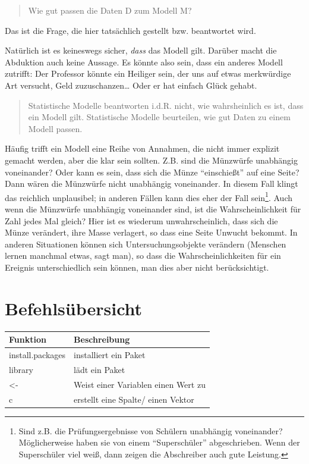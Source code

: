 \documentclass[12pt,ngerman,]{book}
\let\rmarkdownfootnote\footnote%
\def\footnote{\protect\rmarkdownfootnote}
\begin{document}
\begin{quote}
Wie gut passen die Daten D zum Modell M?
\end{quote}

Das ist die Frage, die hier tatsächlich gestellt bzw. beantwortet wird.

Natürlich ist es keineswegs sicher, \emph{dass} das Modell gilt. Darüber
macht die Abduktion auch keine Aussage. Es könnte also sein, dass ein
anderes Modell zutrifft: Der Professor könnte ein Heiliger sein, der uns
auf etwas merkwürdige Art versucht, Geld zuzuschanzen\ldots{} Oder er
hat einfach Glück gehabt.

\begin{quote}
Statistische Modelle beantworten i.d.R. nicht, wie wahrsheinlich es ist,
dass ein Modell gilt. Statistische Modelle beurteilen, wie gut Daten zu
einem Modell passen.
\end{quote}

Häufig trifft ein Modell eine Reihe von Annahmen, die nicht immer
explizit gemacht werden, aber die klar sein sollten. Z.B. sind die
Münzwürfe unabhängig voneinander? Oder kann es sein, dass sich die Münze
``einschießt'' auf eine Seite? Dann wären die Münzwürfe nicht unabhängig
voneinander. In diesem Fall klingt das reichlich unplausibel; in anderen
Fällen kann dies eher der Fall sein\footnote{Sind z.B. die
  Prüfungsergebnisse von Schülern unabhängig voneinander? Möglicherweise
  haben sie von einem ``Superschüler'' abgeschrieben. Wenn der
  Superschüler viel weiß, dann zeigen die Abschreiber auch gute
  Leistung.}. Auch wenn die Münzwürfe unabhängig voneinander sind, ist
die Wahrscheinlichkeit für Zahl jedes Mal gleich? Hier ist es wiederum
unwahrscheinlich, dass sich die Münze verändert, ihre Masse verlagert,
so dass eine Seite Unwucht bekommt. In anderen Situationen können sich
Untersuchungsobjekte verändern (Menschen lernen manchmal etwas, sagt
man), so dass die Wahrscheinlichkeiten für ein Ereignis unterschiedlich
sein können, man dies aber nicht berücksichtigt.

\section{Befehlsübersicht}\label{befehlsubersicht}

\begin{longtable}[]{@{}ll@{}}
\toprule
Funktion & Beschreibung\tabularnewline
\midrule
\endhead
install.packages & installiert ein Paket\tabularnewline
library & lädt ein Paket\tabularnewline
\textless{}- & Weist einer Variablen einen Wert zu\tabularnewline
c & erstellt eine Spalte/ einen Vektor\tabularnewline
\bottomrule
\end{longtable}
\end{document}
